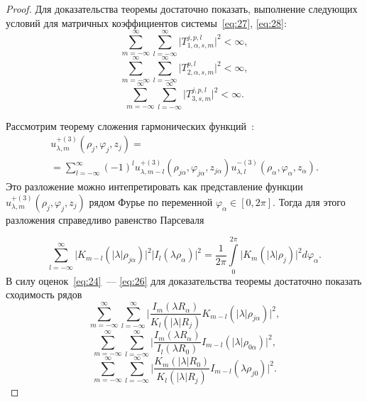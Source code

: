 \begin{russian}
\begin{proof}
Для доказательства теоремы достаточно показать, выполнение следующих условий для матричных коэффициентов системы~\eqref{eq:27}, \eqref{eq:28}:
\begin{equation}
\sum\limits_{m=-\infty}^\infty\sum\limits_{l=-\infty}^\infty\bigg|T_{1,\alpha,s,m}^{j,p,l}\bigg|^2<\infty,
\end{equation}
\begin{equation}
\sum\limits_{m=-\infty}^\infty\sum\limits_{l=-\infty}^\infty\bigg|T_{2,\alpha,s,m}^{p,l}\bigg|^2<\infty,
\end{equation}
\begin{equation}
\sum\limits_{m=-\infty}^\infty\sum\limits_{l=-\infty}^\infty\bigg|T_{3,s,m}^{j,p,l}\bigg|^2<\infty.
\end{equation}
\par Рассмотрим теорему сложения гармонических функций~\cite{Nikolaev2011}:
\begin{multline}
u_{\lambda,m}^{+(3)}(\rho_j,\varphi_j,z_j)=\\
=\sum\limits_{l=-\infty}^\infty(-1)^l u_{\lambda,m-l}^{+(3)}(\rho_{j\alpha},\varphi_{j\alpha},z_{j\alpha}) u_{\lambda,l}^{-(3)}(\rho_\alpha,\varphi_\alpha,z_\alpha).
\end{multline}
Это разложение можно интепретировать как представление функции $u_{\lambda,m}^{+(3)}(\rho_j,\varphi_j,z_j)$ рядом Фурье по переменной $\varphi_\alpha\in[0,2\pi]$. Тогда для этого разложения справедливо равенство Парсеваля{\sloppy\par}
\begin{equation}
\sum\limits_{l=-\infty}^\infty\bigg|K_{m-l}(|\lambda|\rho_{j\alpha})\bigg|^2\bigg|I_l(\lambda\rho_\alpha)\bigg|^2=\frac{1}{2\pi}\int\limits_0^{2\pi}\bigg|K_m(|\lambda|\rho_j)\bigg|^2d\varphi_\alpha.
\label{eq:32}
\end{equation}
В силу оценок~\eqref{eq:24}~--- \eqref{eq:26} для доказательства теоремы достаточно показать сходимость рядов
\begin{equation}
\sum\limits_{m=-\infty}^\infty\sum\limits_{l=-\infty}^\infty\bigg|\frac{I_m(\lambda R_\alpha)}{K_l(|\lambda|R_j)}K_{m-l}(|\lambda|\rho_{j\alpha})\bigg|^2,
\label{eq:29}
\end{equation}
\begin{equation}
\sum\limits_{m=-\infty}^\infty\sum\limits_{l=-\infty}^\infty\bigg|\frac{I_m(\lambda R_\alpha)}{I_l(\lambda R_0)}I_{m-l}(|\lambda|\rho_{0\alpha})\bigg|^2,
\label{eq:30}
\end{equation}
\begin{equation}
\sum\limits_{m=-\infty}^\infty\sum\limits_{l=-\infty}^\infty\bigg|\frac{K_m(|\lambda|R_0)}{K_l(|\lambda|R_j)}I_{m-l}(\lambda\rho_{j0})\bigg|^2.

\end{equation}
\end{proof}
\end{russian}
